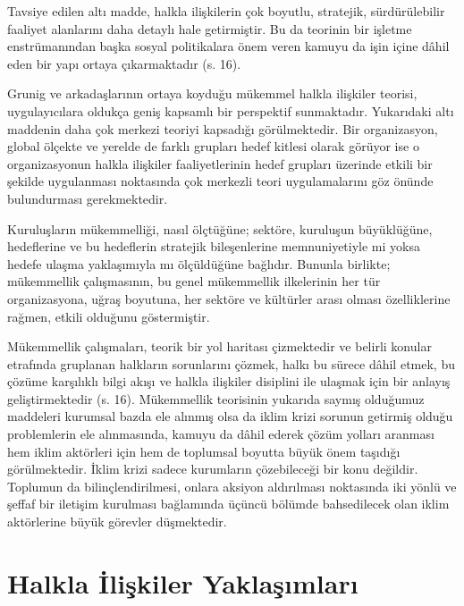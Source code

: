 \documentclass[
]{book}
\begin{document}
Tavsiye edilen altı madde, halkla ilişkilerin çok boyutlu, stratejik, sürdürülebilir faaliyet alanlarını daha detaylı hale getirmiştir. Bu da teorinin bir işletme enstrümanından başka sosyal politikalara önem veren kamuyu da işin içine dâhil eden bir yapı ortaya çıkarmaktadır (s. 16). \citep{kus2019suriyeli}

Grunig ve arkadaşlarının ortaya koyduğu mükemmel halkla ilişkiler teorisi, uygulayıcılara oldukça geniş kapsamlı bir perspektif sunmaktadır. Yukarıdaki altı maddenin daha çok merkezi teoriyi kapsadığı görülmektedir. Bir organizasyon, global ölçekte ve yerelde de farklı grupları hedef kitlesi olarak görüyor ise o organizasyonun halkla ilişkiler faaliyetlerinin hedef grupları üzerinde etkili bir şekilde uygulanması noktasında çok merkezli teori uygulamalarını göz önünde bulundurması gerekmektedir.

Kuruluşların mükemmelliği, nasıl ölçtüğüne; sektöre, kuruluşun büyüklüğüne, hedeflerine ve bu hedeflerin stratejik bileşenlerine memnuniyetiyle mi yoksa hedefe ulaşma yaklaşımıyla mı ölçüldüğüne bağlıdır. Bununla birlikte; mükemmellik çalışmasının, bu genel mükemmellik ilkelerinin her tür organizasyona, uğraş boyutuna, her sektöre ve kültürler arası olması özelliklerine rağmen, etkili olduğunu göstermiştir. \citep{schmitz2012mastering}

Mükemmellik çalışmaları, teorik bir yol haritası çizmektedir ve belirli konular etrafında gruplanan halkların sorunlarını çözmek, halkı bu sürece dâhil etmek, bu çözüme karşılıklı bilgi akışı ve halkla ilişkiler disiplini ile ulaşmak için bir anlayış geliştirmektedir (s. 16).\citep{kus2019suriyeli} Mükemmellik teorisinin yukarıda saymış olduğumuz maddeleri kurumsal bazda ele alınmış olsa da iklim krizi sorunun getirmiş olduğu problemlerin ele alınmasında, kamuyu da dâhil ederek çözüm yolları aranması hem iklim aktörleri için hem de toplumsal boyutta büyük önem taşıdığı görülmektedir. İklim krizi sadece kurumların çözebileceği bir konu değildir. Toplumun da bilinçlendirilmesi, onlara aksiyon aldırılması noktasında iki yönlü ve şeffaf bir iletişim kurulması bağlamında üçüncü bölümde bahsedilecek olan iklim aktörlerine büyük görevler düşmektedir.

\hypertarget{halkla-iliux15fkiler-yaklaux15fux131mlarux131}{%
\section{Halkla İlişkiler Yaklaşımları}\label{halkla-iliux15fkiler-yaklaux15fux131mlarux131}}
\end{document}
